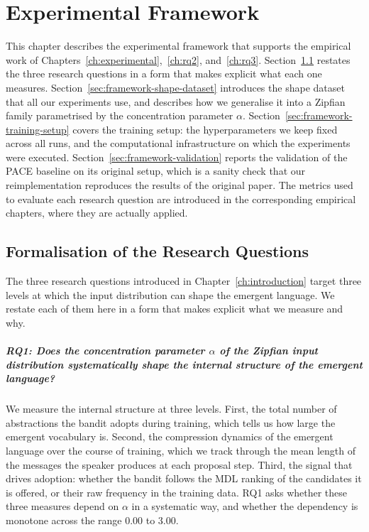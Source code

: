 \chapter{Experimental Framework}
\label{ch:technical}

This chapter describes the experimental framework that supports the empirical work of Chapters~\ref{ch:experimental},~\ref{ch:rq2}, and~\ref{ch:rq3}. Section~\ref{sec:framework-rqs} restates the three research questions in a form that makes explicit what each one measures. Section~\ref{sec:framework-shape-dataset} introduces the shape dataset that all our experiments use, and describes how we generalise it into a Zipfian~\cite{zipf_human_1949} family parametrised by the concentration parameter $\alpha$. Section~\ref{sec:framework-training-setup} covers the training setup: the hyperparameters we keep fixed across all runs, and the computational infrastructure on which the experiments were executed. Section~\ref{sec:framework-validation} reports the validation of the PACE baseline on its original setup, which is a sanity check that our reimplementation reproduces the results of the original paper. The metrics used to evaluate each research question are introduced in the corresponding empirical chapters, where they are actually applied.

\section{Formalisation of the Research Questions}
\label{sec:framework-rqs}

The three research questions introduced in Chapter~\ref{ch:introduction} target three levels at which the input distribution can shape the emergent language. We restate each of them here in a form that makes explicit what we measure and why.

\paragraph*{RQ1: Does the concentration parameter $\alpha$ of the Zipfian input distribution systematically shape the internal structure of the emergent language?}

We measure the internal structure at three levels. First, the total number of abstractions the bandit adopts during training, which tells us how large the emergent vocabulary is. Second, the compression dynamics of the emergent language over the course of training, which we track through the mean length of the messages the speaker produces at each proposal step. Third, the signal that drives adoption: whether the bandit follows the MDL ranking of the candidates it is offered, or their raw frequency in the training data. RQ1 asks whether these three measures depend on $\alpha$ in a systematic way, and whether the dependency is monotone across the range 0.00 to 3.00.

